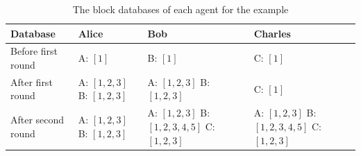 \begin{table}[h!]
    \centering
    \caption{The block databases of each agent for the example}
    \label{tab:blocks_example}
    \begin{tabular}{p{4cm}|p{3cm}|p{4cm}|p{3cm}}
        \toprule
        Database & Alice & Bob & Charles \\
        \midrule
        Before first round & A: $[1]$ & B: $[1]$ & C: $[1]$ \\ \hline 
        After first round & A: $[1, 2, 3]$ \newline B: $[1, 2, 3]$ & A: $[1, 2, 3]$ \newline B: $[1, 2, 3]$ & C: $[1]$ \\ \hline
        After second round &  A: $[1, 2, 3]$ \newline B: $[1, 2, 3]$ & A: $[1, 2, 3]$ \newline B: $[1, 2, 3, 4, 5]$ \newline C: $[1, 2, 3]$ & A: $[1, 2, 3]$ \newline B: $[1, 2, 3, 4, 5]$ \newline C: $[1, 2, 3]$ \\
        \bottomrule
    \end{tabular}
\end{table}

